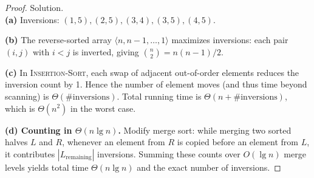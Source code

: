 \documentclass[12pt]{article}
\theoremstyle{definition}
\begin{document}
\vspace{1pt}

\begin{proof}
Solution.\\

\noindent
\textbf{(a)} Inversions: $(1,5),(2,5),(3,4),(3,5),(4,5)$.

\smallskip
\noindent
\textbf{(b)} The reverse-sorted array $\langle n,n-1,\dots,1\rangle$ maximizes inversions:
each pair $(i,j)$ with $i<j$ is inverted, giving $\binom{n}{2}=n(n-1)/2$.

\smallskip
\noindent
\textbf{(c)} In \textsc{Insertion-Sort}, each swap of adjacent out-of-order elements reduces the inversion count by 1.
Hence the number of element moves (and thus time beyond scanning) is $\Theta(\text{\# inversions})$.
Total running time is $\Theta(n+\text{\# inversions})$, which is $\Theta(n^2)$ in the worst case.

\smallskip
\noindent
\textbf{(d) Counting in $\Theta(n\lg n)$.}
Modify merge sort: while merging two sorted halves $L$ and $R$, whenever an element
from $R$ is copied before an element from $L$, it contributes $|L_{\text{remaining}}|$ inversions.
Summing these counts over $O(\lg n)$ merge levels yields total time $\Theta(n\lg n)$ and the exact number of inversions.
\end{proof}
\end{document}
